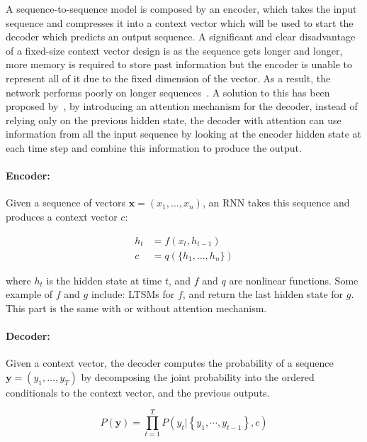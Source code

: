 A sequence-to-sequence model is composed by an encoder, which takes the input sequence and compresses it into a context vector which will be used to start the decoder which predicts an output sequence.  A significant and clear disadvantage of a fixed-size context vector design is as the sequence gets longer and longer, more memory is required to store past information but the encoder is unable to represent all of it due to the fixed dimension of the vector. As a result, the network performs poorly on longer sequences~\citep{cho-etal-2014-properties}. A solution to this has been proposed by~\cite{bahdanau2014neural}, by introducing an attention mechanism for the decoder, instead of relying only on the previous hidden state, the decoder with attention can use information from all the input sequence by looking at the encoder hidden state at each time step and combine this information to produce the output.

\paragraph{Encoder:} Given a sequence of vectors $\textbf{x} = (x_1, \dots, x_n)$, an RNN takes this sequence and produces a context vector $c$:

\begin{equation}
    \begin{split}
        h_t & = f(x_t, h_{t-1})\\
        c & = q(\{h_1, \dots, h_n\}) 
    \end{split}
\end{equation}

where $h_t$ is the hidden state at time $t$, and $f$ and $q$ are nonlinear functions. Some example of $f$ and $g$ include: LTSMs for $f$, and return the last hidden state for $g$. This part is the same with or without attention mechanism.



\paragraph{Decoder:} Given a context vector, the decoder computes the probability of a sequence $\textbf{y} = (y_1, \dots, y_T)$ by decomposing the joint probability into the ordered conditionals to the context vector, and the previous outputs.

\begin{equation}
P(\mathbf{y})=\prod_{t=1}^{T} P\left(y_{t} |\left\{y_{1}, \cdots, y_{t-1}\right\}, c\right)
\end{equation}


